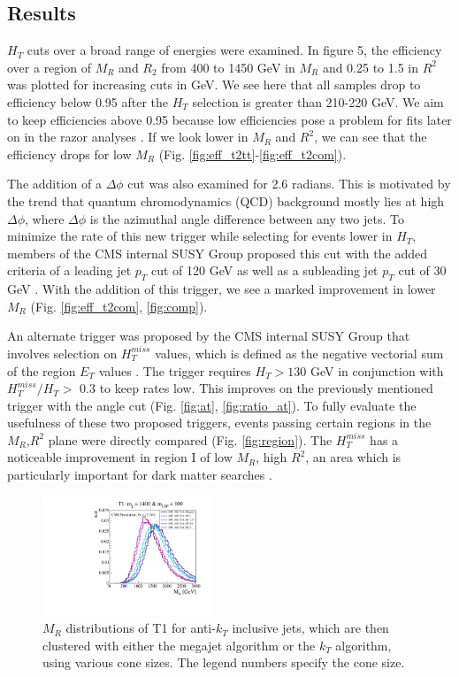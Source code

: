 \documentclass[twocolumn,aps,prd,reprint]{revtex4-1}
\begin{document}
\subsection{Results}
\par $H_T$ cuts over a broad range of energies were examined. In figure 5, the efficiency over a region of $M_R$ and $R_2$ from 400 to 1450 GeV in $M_R$ and 0.25 to 1.5 in $R^2$ was plotted for increasing cuts in GeV. We see here that all samples drop to efficiency below 0.95 after the $H_T$ selection is greater than 210-220 GeV. We aim to keep efficiencies above 0.95 because low efficiencies pose a problem for fits later on in the razor analyses \cite{talk}. If we look lower in $M_R$ and $R^2$, we can see that the efficiency drops for low $M_R$ (Fig. \ref{fig:eff_t2tt}-\ref{fig:eff_t2com}).  
\par The addition of a $\Delta \phi$ cut was also examined for 2.6 radians. This is motivated by the trend that quantum chromodynamics (QCD) background mostly lies at high $\Delta \phi$, where $\Delta \phi$ is the azimuthal angle difference between any two jets. To minimize the rate of this new trigger while selecting for events lower in $H_T$, members of the CMS internal SUSY Group proposed this cut with the added criteria of a leading jet $p_T$ cut of 120 GeV as well as a subleading jet $p_T$ cut of 30 GeV \cite{susy_group}. With the addition of this trigger, we see a marked improvement in lower $M_R$ (Fig. \ref{fig:eff_t2com}, \ref{fig:comp}).
\par An alternate trigger was proposed by the CMS internal SUSY Group that involves selection on $H_T^{miss}$ values, which is defined as the negative vectorial sum of the region $E_T$ values \cite{susy_group}. The trigger requires $H_T > 130$ GeV in conjunction with $H_T^{miss}/H_T >$ 0.3 to keep rates low. This improves on the previously mentioned trigger with the angle cut (Fig. \ref{fig:at}, \ref{fig:ratio_at}). To fully evaluate the usefulness of these two proposed triggers, events passing certain regions in the $M_R$,$R^2$ plane were directly compared (Fig. \ref{fig:region}). The $H_T^{miss}$ has a noticeable improvement in region I of low $M_R$, high $R^2$, an area which is particularly important for dark matter searches \cite{dark_razor}.
\begin{figure}[h]
 \includegraphics[width=0.45\textwidth]{cones_T1_1400_100_0_4.pdf}
\caption{\label{fig:t1_clstr} $M_R$ distributions of T1 for anti-$k_T$ inclusive jets, which are then clustered with either the megajet algorithm or the $k_T$ algorithm, using various cone sizes. The legend numbers specify the cone size.}
\end{figure}
\end{document}
